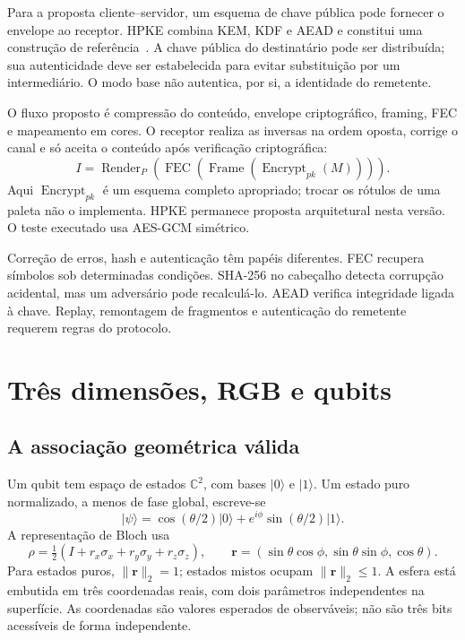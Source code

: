 \documentclass[11pt,a4paper]{article}
\begin{document}
Para a proposta cliente--servidor, um esquema de chave pública pode fornecer o envelope ao receptor. HPKE combina KEM, KDF e AEAD e constitui uma construção de referência~\cite{2022barnesHpke}. A chave pública do destinatário pode ser distribuída; sua autenticidade deve ser estabelecida para evitar substituição por um intermediário. O modo base não autentica, por si, a identidade do remetente.

O fluxo proposto é compressão do conteúdo, envelope criptográfico, framing, FEC e mapeamento em cores. O receptor realiza as inversas na ordem oposta, corrige o canal e só aceita o conteúdo após verificação criptográfica:
\begin{equation}
I=\operatorname{Render}_{P}\!\left(\operatorname{FEC}\!\left(
\operatorname{Frame}(\operatorname{Encrypt}_{pk}(M))\right)\right).
\end{equation}
Aqui $\operatorname{Encrypt}_{pk}$ é um esquema completo apropriado; trocar os rótulos de uma paleta não o implementa. HPKE permanece proposta arquitetural nesta versão. O teste executado usa AES-GCM simétrico.

Correção de erros, hash e autenticação têm papéis diferentes. FEC recupera símbolos sob determinadas condições. SHA-256 no cabeçalho detecta corrupção acidental, mas um adversário pode recalculá-lo. AEAD verifica integridade ligada à chave. Replay, remontagem de fragmentos e autenticação do remetente requerem regras do protocolo.

\section{Três dimensões, RGB e qubits}
\subsection{A associação geométrica válida}
Um qubit tem espaço de estados $\mathbb C^2$, com bases $|0\rangle$ e $|1\rangle$. Um estado puro normalizado, a menos de fase global, escreve-se~\cite{ibmBloch}
\begin{equation}
|\psi\rangle=\cos(\theta/2)|0\rangle+e^{i\phi}\sin(\theta/2)|1\rangle.
\end{equation}
A representação de Bloch usa
\begin{equation}
\rho=\tfrac12(I+r_x\sigma_x+r_y\sigma_y+r_z\sigma_z),\qquad
\mathbf r=(\sin\theta\cos\phi,\sin\theta\sin\phi,\cos\theta).
\end{equation}
Para estados puros, $\|\mathbf r\|_2=1$; estados mistos ocupam $\|\mathbf r\|_2\le1$. A esfera está embutida em três coordenadas reais, com dois parâmetros independentes na superfície. As coordenadas são valores esperados de observáveis; não são três bits acessíveis de forma independente.
\end{document}
